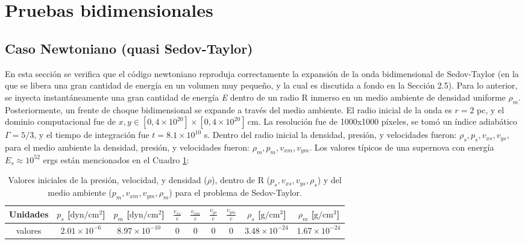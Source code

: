 \documentclass[12pt,a4paper]{book}
\begin{document}


\section{Pruebas bidimensionales}

\subsection{Caso Newtoniano (quasi Sedov-Taylor)}\label{subsec:caso_newtoniano_2d}

En esta sección se verifica que el código newtoniano reproduja correctamente la expansión de la onda bidimensional de Sedov-Taylor (en la que se libera una gran cantidad de energía en un volumen muy pequeño, 
y la cual es discutida a fondo en la Sección 2.5). Para lo anterior, se inyecta instantáneamente una gran cantidad de energía \emph{E} dentro de un radio R inmerso en un medio ambiente de densidad uniforme $\rho_m$. 
Posteriormente, un frente de choque bidimensional se expande a través del medio ambiente. El radio inicial de la onda es $r = 2$ pc, y el dominio computacional fue de 
$x, y \in [0,4 \times 10^{20}]\times[0,4 \times 10^{20}] \, \text{cm}$. La resolución fue de 1000x1000 píxeles, se tomó un índice adiabático $\Gamma = 5/3$, y el tiempo de integración 
fue $t = 8.1 \times 10^{10}$ s. Dentro del radio inicial la densidad, presión, y velocidades fueron: $\rho_s, p_s, v_{xs}, v_{ys}$, para el medio ambiente la densidad, presión, y velocidades fueron: 
$\rho_m, p_m, v_{xm}, v_{ym}$. Los valores típicos de una supernova con energía $E_{s}  \approx 10^{52}$ ergs están mencionados en el Cuadro \ref{Cuadro_parametros_choque_2D_newtoniano}:

\begin{table}[htbp]
  \begin{center}
  \begin{tabular}{|c|c|c|c|c|c|c|c|c|}
  \hline 
  \textbf{Unidades} & \textbf{$p_s$} [$\text{dyn}/\text{cm}^2$] & 
  \textbf{$p_m$} [$\text{dyn}/\text{cm}^2$] & 
  $\frac{v_{xs}}{c}$ & $\frac{v_{xm}}{c}$  & $\frac{v_{ys}}{c}$ & $\frac{v_{ym}}{c}$  & 
  \textbf{$\rho_s$} [$\text{g}/\text{cm}^3$]& 
  \textbf{$\rho_m$} [$\text{g}/\text{cm}^3$]\\ 
  \hline 
  valores & $2.01 \times 10^{-6}$ & $8.97 \times 10^{-10}$  & 0 & 0 & 0 & 0 &  $3.48 \times 10^{-24}$  & $1.67 \times 10^{-24}$ \\ 
  \hline 
  \end{tabular}
  \caption{\label{Cuadro_parametros_choque_2D_newtoniano} Valores iniciales 
  de la presión, velocidad, y densidad ($\rho$), dentro de R ($p_s, v_{xs}, v_{ys}, \rho_s$) y del medio ambiente ($p_m, v_{xm}, v_{ym}, \rho_m$) para el problema de Sedov-Taylor.}
  \end{center}
\end{table}
\end{document}
